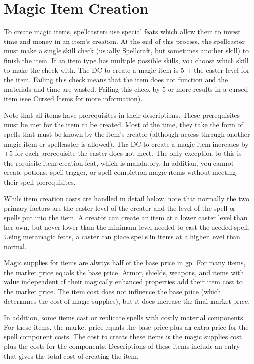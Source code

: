 \section{Magic Item Creation}

\label{f0}				
To create magic items, spellcasters use special feats which allow them to invest time and money in an item's creation. At the end of this process, the spellcaster must make a single skill check (usually Spellcraft, but sometimes another skill) to finish the item. If an item type has multiple possible skills, you choose which skill to make the check with. The DC to create a magic item is 5 + the caster level for the item. Failing this check means that the item does not function and the materials and time are wasted. Failing this check by 5 or more results in a cursed item (see Cursed Items for more information).
				
Note that all items have prerequisites in their descriptions. These prerequisites must be met for the item to be created. Most of the time, they take the form of spells that must be known by the item's creator (although access through another magic item or spellcaster is allowed). The DC to create a magic item increases by +5 for each prerequisite the caster does not meet. The only exception to this is the requisite item creation feat, which is mandatory. In addition, you cannot create potions, spell-trigger, or spell-completion magic items without meeting their spell prerequisites.
				
While item creation costs are handled in detail below, note that normally the two primary factors are the caster level of the creator and the level of the spell or spells put into the item. A creator can create an item at a lower caster level than her own, but never lower than the minimum level needed to cast the needed spell. Using metamagic feats, a caster can place spells in items at a higher level than normal.
				
Magic supplies for items are always half of the base price in gp. For many items, the market price equals the base price. Armor, shields, weapons, and items with value independent of their magically enhanced properties add their item cost to the market price. The item cost does not influence the base price (which determines the cost of magic supplies), but it does increase the final market price.
				
In addition, some items cast or replicate spells with costly material components. For these items, the market price equals the base price plus an extra price for the spell component costs. The cost to create these items is the magic supplies cost plus the costs for the components. Descriptions of these items include an entry that gives the total cost of creating the item.
				
